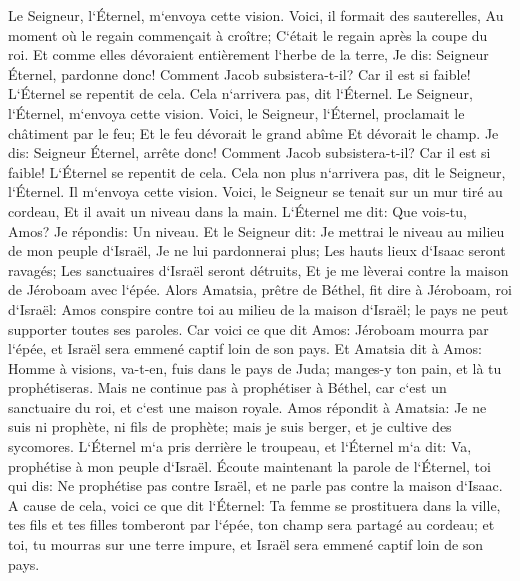 \verse Le Seigneur, l`Éternel, m`envoya cette vision. Voici, il formait des sauterelles, Au moment où le regain commençait à croître; C`était le regain après la coupe du roi. 
\verse Et comme elles dévoraient entièrement l`herbe de la terre, Je dis: Seigneur Éternel, pardonne donc! Comment Jacob subsistera-t-il? Car il est si faible! 
\verse L`Éternel se repentit de cela. Cela n`arrivera pas, dit l`Éternel. 
\verse Le Seigneur, l`Éternel, m`envoya cette vision. Voici, le Seigneur, l`Éternel, proclamait le châtiment par le feu; Et le feu dévorait le grand abîme Et dévorait le champ. 
\verse Je dis: Seigneur Éternel, arrête donc! Comment Jacob subsistera-t-il? Car il est si faible! 
\verse L`Éternel se repentit de cela. Cela non plus n`arrivera pas, dit le Seigneur, l`Éternel. 
\verse Il m`envoya cette vision. Voici, le Seigneur se tenait sur un mur tiré au cordeau, Et il avait un niveau dans la main. 
\verse L`Éternel me dit: Que vois-tu, Amos? Je répondis: Un niveau. Et le Seigneur dit: Je mettrai le niveau au milieu de mon peuple d`Israël, Je ne lui pardonnerai plus; 
\verse Les hauts lieux d`Isaac seront ravagés; Les sanctuaires d`Israël seront détruits, Et je me lèverai contre la maison de Jéroboam avec l`épée. 
\verse Alors Amatsia, prêtre de Béthel, fit dire à Jéroboam, roi d`Israël: Amos conspire contre toi au milieu de la maison d`Israël; le pays ne peut supporter toutes ses paroles. 
\verse Car voici ce que dit Amos: Jéroboam mourra par l`épée, et Israël sera emmené captif loin de son pays. 
\verse Et Amatsia dit à Amos: Homme à visions, va-t-en, fuis dans le pays de Juda; manges-y ton pain, et là tu prophétiseras. 
\verse Mais ne continue pas à prophétiser à Béthel, car c`est un sanctuaire du roi, et c`est une maison royale. 
\verse Amos répondit à Amatsia: Je ne suis ni prophète, ni fils de prophète; mais je suis berger, et je cultive des sycomores. 
\verse L`Éternel m`a pris derrière le troupeau, et l`Éternel m`a dit: Va, prophétise à mon peuple d`Israël. 
\verse Écoute maintenant la parole de l`Éternel, toi qui dis: Ne prophétise pas contre Israël, et ne parle pas contre la maison d`Isaac. 
\verse A cause de cela, voici ce que dit l`Éternel: Ta femme se prostituera dans la ville, tes fils et tes filles tomberont par l`épée, ton champ sera partagé au cordeau; et toi, tu mourras sur une terre impure, et Israël sera emmené captif loin de son pays. 

\chapter{}

